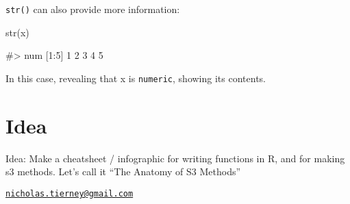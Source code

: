 \texttt{str()} can also provide more information:

\begin{Schunk}
\begin{Sinput}
str(x)
\end{Sinput}
\begin{Soutput}
#>  num [1:5] 1 2 3 4 5
\end{Soutput}
\end{Schunk}

In this case, revealing that x is \texttt{numeric}, showing its
contents.

\section{Idea}\label{idea}

Idea: Make a cheatsheet / infographic for writing functions in R, and
for making s3 methods. Let's call it ``The Anatomy of S3 Methods''

\address{%
Nicholas Tierney\\
Queensland University of Technology\\
Y806C.2 Main Drive, QUT, Brisbane\\
}
\href{mailto:nicholas.tierney@gmail.com}{\nolinkurl{nicholas.tierney@gmail.com}}

